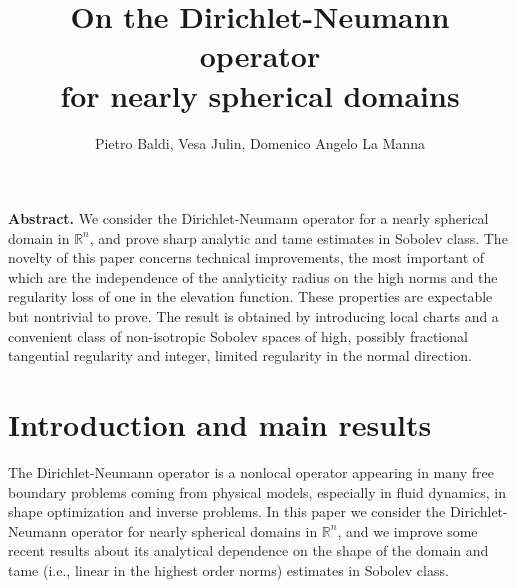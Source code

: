 \documentclass[10pt,reqno,a4paper]{article}
\title{On the Dirichlet-Neumann operator\\ for nearly spherical domains}
\author{\normalsize{Pietro Baldi, Vesa Julin, Domenico Angelo La Manna}}
\date{}
\numberwithin{equation}{section}
\theoremstyle{plain}
\theoremstyle{definition}
\newcommand{\R}{{\mathbb R}}
\begin{document}
\maketitle


\noindent
\textbf{Abstract.} 
We consider the Dirichlet-Neumann operator for a nearly spherical domain in $\R^n$, 
and prove sharp analytic and tame estimates in Sobolev class. 
The novelty of this paper concerns technical improvements,  
the most important of which are the independence of the analyticity radius on the high norms 
and the regularity loss of one in the elevation function. 
These properties are expectable but nontrivial to prove. 
The result is obtained by introducing local charts and a convenient class 
of non-isotropic Sobolev spaces of high, possibly fractional tangential regularity 
and integer, limited regularity in the normal direction. 

\tableofcontents

\section{Introduction and main results} 
\label{sec:intro}

The Dirichlet-Neumann operator is a nonlocal operator 
appearing in many free boundary problems coming from physical models,
especially in fluid dynamics, in shape optimization and inverse problems. 
In this paper we consider the Dirichlet-Neumann operator for nearly spherical domains in $\R^n$, 
and we improve some recent results about its analytical dependence on the shape of the domain 
and tame (i.e., linear in the highest order norms) estimates in Sobolev class. 
\end{document}
